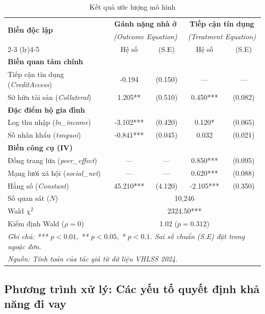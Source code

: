 \documentclass[12pt,a4paper]{report}
\begin{document}
\begin{table}[htbp]
	\centering
	\caption{Kết quả ước lượng mô hình}
	\label{tab:main_results_academic}
	\small %
	\begin{tabular}{lcccc}
		\toprule
		\multirow{2}{*}{\textbf{Biến độc lập}} & \multicolumn{2}{c}{\textbf{Gánh nặng nhà ở}} & \multicolumn{2}{c}{\textbf{Tiếp cận tín dụng}} \\
		& \multicolumn{2}{c}{\textit{(Outcome Equation)}} & \multicolumn{2}{c}{\textit{(Treatment Equation)}} \\
		\cmidrule(lr){2-3} \cmidrule(lr){4-5}
		& Hệ số & (S.E) & Hệ số & (S.E) \\
		\midrule
		\textbf{Biến quan tâm chính} & & & & \\
		Tiếp cận tín dụng (\textit{CreditAccess}) & -0.194 & (0.150) & --- & --- \\
		Sở hữu tài sản (\textit{Collateral}) & 1.205** & (0.510) & 0.450*** & (0.082) \\
		\midrule
		\textbf{Đặc điểm hộ gia đình} & & & & \\
		Log thu nhập (\textit{ln\_income}) & -3.102*** & (0.420) & 0.120* & (0.065) \\
		Số nhân khẩu (\textit{tsnguoi}) & -0.841*** & (0.045) & 0.032 & (0.021) \\
		\midrule
		\textbf{Biến công cụ (IV)} & & & & \\
		Đồng trang lứa (\textit{peer\_effect}) & --- & --- & 0.850*** & (0.095) \\
		Mạng lưới xã hội (\textit{social\_net}) & --- & --- & 0.620*** & (0.088) \\
		\midrule
		Hằng số (\textit{Constant}) & 45.210*** & (4.120) & -2.105*** & (0.350) \\
		\midrule
		Số quan sát ($N$) & \multicolumn{4}{c}{10,246} \\
		Wald $\chi^2$ & \multicolumn{4}{c}{2324.50***} \\
		Kiểm định Wald ($\rho = 0$) & \multicolumn{4}{c}{1.02 ($p=0.312$)} \\
		\bottomrule
		\multicolumn{5}{l}{\footnotesize \textit{Ghi chú: *** $p<0.01$, ** $p<0.05$, * $p<0.1$. Sai số chuẩn (S.E) đặt trong ngoặc đơn.}} \\
		\multicolumn{5}{l}{\footnotesize \textit{Nguồn: Tính toán của tác giả từ dữ liệu VHLSS 2024.}}
	\end{tabular}
\end{table}

\subsection{Phương trình xử lý: Các yếu tố quyết định khả năng đi vay}
\end{document}
